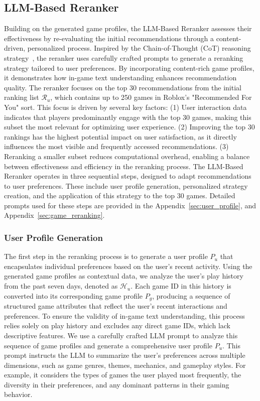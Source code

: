 \subsection{LLM-Based Reranker}
Building on the generated game profiles, the LLM-Based Reranker assesses their effectiveness by re-evaluating the initial recommendations through a content-driven, personalized process. Inspired by the Chain-of-Thought (CoT) reasoning strategy~\cite{wei2022chain}, the reranker uses carefully crafted prompts to generate a reranking strategy tailored to user preferences. By incorporating content-rich game profiles, it demonstrates how in-game text understanding enhances recommendation quality. The reranker focuses on the top 30 recommendations from the initial ranking list $\mathcal{R}_u$, which contains up to 250 games in Roblox’s "Recommended For You" sort. This focus is driven by several key factors: (1) User interaction data indicates that players predominantly engage with the top 30 games, making this subset the most relevant for optimizing user experience. (2) Improving the top 30 rankings has the highest potential impact on user satisfaction, as it directly influences the most visible and frequently accessed recommendations. (3) Reranking a smaller subset reduces computational overhead, enabling a balance between effectiveness and efficiency in the reranking process. The LLM-Based Reranker operates in three sequential steps, designed to adapt recommendations to user preferences. These include user profile generation, personalized strategy creation, and the application of this strategy to the top 30 games. Detailed prompts used for these steps are provided in the Appendix~\ref{sec:user_profile}, and Appendix~\ref{sec:game_reranking}.

\subsubsection{User Profile Generation}
The first step in the reranking process is to generate a user profile $P_u$ that encapsulates individual preferences based on the user’s recent activity. Using the generated game profiles as contextual data, we analyze the user’s play history from the past seven days, denoted as $\mathcal{H}_u$. Each game ID in this history is converted into its corresponding game profile $P_g$, producing a sequence of structured game attributes that reflect the user’s recent interactions and preferences. To ensure the validity of in-game text understanding, this process relies solely on play history and excludes any direct game IDs, which lack descriptive features. We use a carefully crafted LLM prompt to analyze this sequence of game profiles and generate a comprehensive user profile $P_u$. This prompt instructs the LLM to summarize the user’s preferences across multiple dimensions, such as game genres, themes, mechanics, and gameplay styles. For example, it considers the types of games the user played most frequently, the diversity in their preferences, and any dominant patterns in their gaming behavior.

